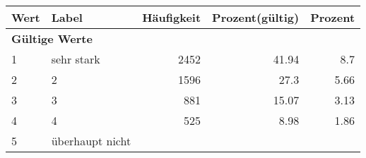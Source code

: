      \begin{longtable}{lXrrr}
     \toprule
     \textbf{Wert} & \textbf{Label} & \textbf{Häufigkeit} & \textbf{Prozent(gültig)} & \textbf{Prozent} \\
     \endhead
     \midrule
     \multicolumn{5}{l}{\textbf{Gültige Werte}}\\

     1 &
     \multicolumn{1}{X}{ sehr stark   } &


       \num{2452} &
       \num[round-mode=places,round-precision=2]{41,94} &
         \num[round-mode=places,round-precision=2]{8,7} \\

     2 &
     \multicolumn{1}{X}{ 2   } &


       \num{1596} &
       \num[round-mode=places,round-precision=2]{27,3} &
         \num[round-mode=places,round-precision=2]{5,66} \\

     3 &
     \multicolumn{1}{X}{ 3   } &


       \num{881} &
       \num[round-mode=places,round-precision=2]{15,07} &
         \num[round-mode=places,round-precision=2]{3,13} \\

     4 &
     \multicolumn{1}{X}{ 4   } &


       \num{525} &
       \num[round-mode=places,round-precision=2]{8,98} &
         \num[round-mode=places,round-precision=2]{1,86} \\

     5 &
     \multicolumn{1}{X}{ überhaupt nicht   } &



\end{longtable}

